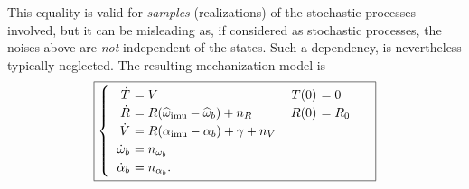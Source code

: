 \documentclass[]{article}
\def\w{\omega}
\def\imu{_\mathrm{imu}}
\begin{document}
This equality is valid for {\em samples} (realizations) of the stochastic processes involved, but it can be misleading as, if considered as stochastic processes, the noises above are {\em not} independent of the states. Such a dependency, is nevertheless typically neglected. The resulting mechanization model is
\begin{equation}
\boxed{
\begin{cases}
\begin{tabular}{>{$}r<{$} >{$\!\!\!\!\!}l<{$} >{$}r<{$} >{$\!\!\!\!\!}l<{$}}
\dot T &= V &T(0) &= 0 \\
\dot R &= R (\widehat \w\imu  - \widehat \w_b) + n_{R} &R(0) &= R_0\\
\dot V &= R(\alpha\imu  - \alpha_b) + \gamma + n_V \\ %
\dot \w_b &= n_{\w_b} \\
\dot \alpha_b &= n_{\alpha_b}. 
\end{tabular}
\end{cases}
}
\label{eq-mech}
\end{equation}
\end{document}
